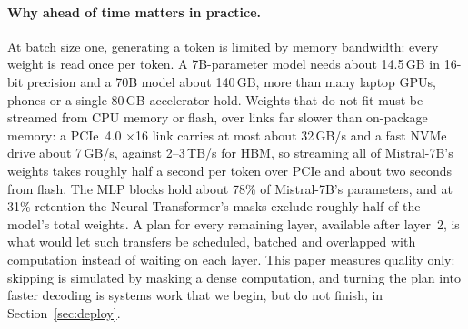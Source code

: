 \documentclass[10pt,twocolumn,letterpaper]{article}
\begin{document}
\paragraph{Why ahead of time matters in practice.} At batch size one, generating a token is limited by memory bandwidth: every weight is read once per token. A 7B-parameter model needs about 14.5\,GB in 16-bit precision and a 70B model about 140\,GB, more than many laptop GPUs, phones or a single 80\,GB accelerator hold. Weights that do not fit must be streamed from CPU memory or flash, over links far slower than on-package memory: a PCIe~4.0 $\times$16 link carries at most about 32\,GB/s and a fast NVMe drive about 7\,GB/s, against 2--3\,TB/s for HBM, so streaming all of Mistral-7B's weights takes roughly half a second per token over PCIe and about two seconds from flash. The MLP blocks hold about 78\% of Mistral-7B's parameters, and at 31\% retention the Neural Transformer's masks exclude roughly half of the model's total weights. A plan for every remaining layer, available after layer~2, is what would let such transfers be scheduled, batched and overlapped with computation instead of waiting on each layer. This paper measures quality only: skipping is simulated by masking a dense computation, and turning the plan into faster decoding is systems work that we begin, but do not finish, in Section~\ref{sec:deploy}.
\end{document}
